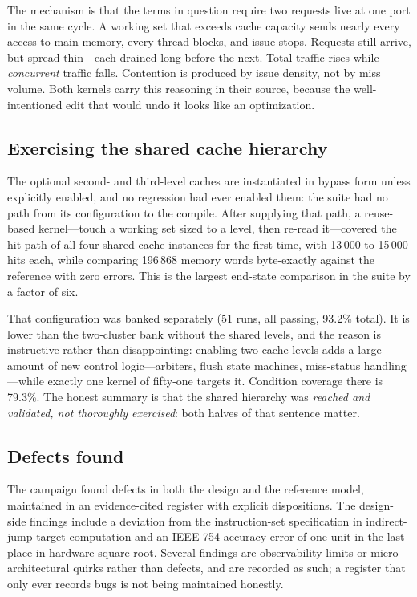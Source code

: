 \documentclass[conference]{IEEEtran}
\begin{document}
The mechanism is that the terms in question require two requests live at
one port in the same cycle. A working set that exceeds cache capacity
sends nearly every access to main memory, every thread blocks, and
issue stops. Requests still arrive, but spread thin---each drained long
before the next. Total traffic rises while \emph{concurrent} traffic
falls. Contention is produced by issue density, not by miss volume. Both
kernels carry this reasoning in their source, because the
well-intentioned edit that would undo it looks like an optimization.

\subsection{Exercising the shared cache hierarchy}
The optional second- and third-level caches are instantiated in bypass
form unless explicitly enabled, and no regression had ever enabled them:
the suite had no path from its configuration to the compile. After
supplying that path, a reuse-based kernel---touch a working set sized to a
level, then re-read it---covered the hit path of all four shared-cache
instances for the first time, with 13\,000 to 15\,000 hits each, while
comparing 196\,868 memory words byte-exactly against the reference with
zero errors. This is the largest end-state comparison in the suite by a
factor of six.

That configuration was banked separately (51 runs, all passing, 93.2\% total).
It is lower than the two-cluster bank without the shared levels, and the reason
is instructive rather than disappointing: enabling two cache levels adds a large
amount of new control logic---arbiters, flush state machines, miss-status
handling---while exactly one kernel of fifty-one targets it. Condition coverage
there is 79.3\%. The honest summary is that the shared hierarchy was
\emph{reached and validated, not thoroughly exercised}: both halves of that
sentence matter.

\subsection{Defects found}
The campaign found defects in both the design and the reference model,
maintained in an evidence-cited register with explicit dispositions. The
design-side findings include a deviation from the instruction-set
specification in indirect-jump target computation and an IEEE-754 accuracy
error of one unit in the last place in hardware square root. Several
findings are observability limits or micro-architectural quirks rather
than defects, and are recorded as such; a register that only ever records
bugs is not being maintained honestly.
\end{document}
